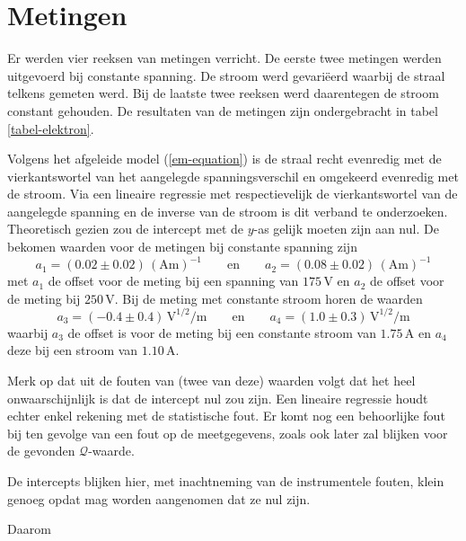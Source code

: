 \section{Metingen}


Er werden vier reeksen van metingen verricht. De eerste twee metingen 
werden uitgevoerd bij constante spanning. De stroom werd gevari\"eerd 
waarbij de straal telkens gemeten werd. Bij de laatste twee reeksen werd 
daarentegen de stroom constant gehouden. De resultaten van de metingen zijn 
ondergebracht in tabel \ref{tabel-elektron}.

Volgens het afgeleide model (\ref{em-equation}) is de straal recht 
evenredig met de vierkantswortel van het aangelegde spanningsverschil en 
omgekeerd evenredig met de stroom. Via een lineaire regressie met 
respectievelijk de vierkantswortel van de aangelegde spanning en de inverse 
van de stroom is dit verband te onderzoeken. Theoretisch gezien zou de 
intercept met de $y$-as gelijk moeten zijn aan nul.  De bekomen waarden 
voor de metingen bij constante spanning zijn
$$
a_1 = (0.02 \pm 0.02)\,(\textrm{Am})^{-1}
\qquad \textrm{en} \qquad
a_2 = (0.08 \pm 0.02)\,(\textrm{Am})^{-1}
$$
met $a_1$ de offset voor de meting bij een spanning van $175$\,V en $a_2$ de 
offset voor de meting bij $250$\,V. Bij de meting met constante stroom horen de 
waarden
$$
a_3 = (-0.4 \pm 0.4)\,\textrm{V}^{1/2}\textrm{/m}
\qquad \textrm{en} \qquad
a_4 = (1.0 \pm 0.3)\,\textrm{V}^{1/2}\textrm{/m}
$$
waarbij $a_3$ de offset is voor de meting bij een constante stroom van 
$1.75$\,A en $a_4$ deze bij een stroom van $1.10$\,A.

Merk op dat uit de fouten van (twee van deze) waarden volgt dat het heel 
onwaarschijnlijk is dat de intercept nul zou zijn. Een lineaire regressie 
houdt echter enkel rekening met de statistische fout. Er komt nog een 
behoorlijke fout bij ten gevolge van een fout op de meetgegevens, zoals ook 
later zal blijken voor de gevonden $\mathcal{Q}$-waarde.

De intercepts blijken hier, met inachtneming van de instrumentele fouten, 
klein genoeg opdat mag worden aangenomen dat ze nul zijn.

Daarom
